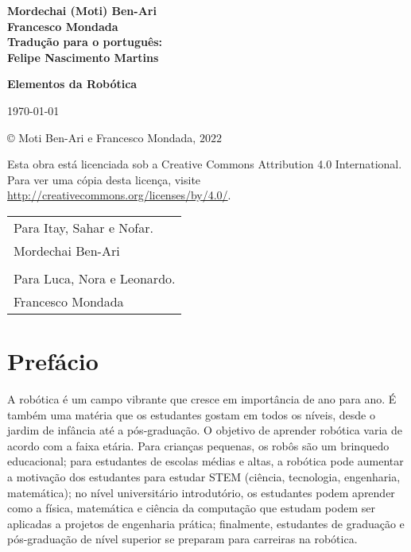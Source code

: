 
\begin{center}
\textbf{\Large Mordechai (Moti) Ben-Ari\\[12pt]Francesco Mondada\\[12pt]
Tradução para o português: \\[12pt]
Felipe Nascimento Martins}

\bigskip
\bigskip
\bigskip
\bigskip

\textbf{\huge Elementos da Robótica}

\bigskip
\bigskip

\large\today
\end{center}

\vfill

\begin{center}
\copyright{} Moti Ben-Ari e Francesco Mondada, $2022$
 \end{center}
 
\begin{small}
Esta obra está licenciada sob a Creative Commons Attribution 4.0 International. Para ver uma cópia desta licença, visite \url{http://creativecommons.org/licenses/by/4.0/}.
\end{small}


\newpage
\mbox{}
\vfill
\begin{center}
\begin{tabular}{l}
Para Itay, Sahar e Nofar.\\
Mordechai Ben-Ari\\
\\
Para Luca, Nora e Leonardo.\\
Francesco Mondada
\end{tabular}
\end{center}
\vfill
\mbox{}
\newpage

\chapter*{Prefácio}

A robótica é um campo vibrante que cresce em importância de ano para ano. É também uma matéria que os estudantes gostam em todos os níveis, desde o jardim de infância até a pós-graduação. O objetivo de aprender robótica varia de acordo com a faixa etária. Para crianças pequenas, os robôs são um brinquedo educacional; para estudantes de escolas médias e altas, a robótica pode aumentar a motivação dos estudantes para estudar STEM (ciência, tecnologia, engenharia, matemática); no nível universitário introdutório, os estudantes podem aprender como a física, matemática e ciência da computação que estudam podem ser aplicadas a projetos de engenharia prática; finalmente, estudantes de graduação e pós-graduação de nível superior se preparam para carreiras na robótica.

